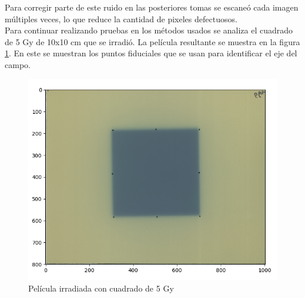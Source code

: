 Para corregir parte de este ruido en las posteriores tomas se escaneó cada imagen múltiples veces, lo que reduce la cantidad de pixeles defectuosos.\\

Para continuar realizando pruebas en los métodos usados se analiza el cuadrado de 5 Gy de 10x10 cm que se irradió. La película resultante se muestra en la figura \ref{fig:cuadrado5Gy}. En este se muestran los puntos fiduciales que se usan para identificar el eje del campo.\\

\begin{figure}[H]
	\centering
	\includegraphics[width=0.7\linewidth]{images/peliculaCuadrado.png}
	\caption{Película irradiada con cuadrado de 5 Gy }
	\label{fig:cuadrado5Gy}
\end{figure}

